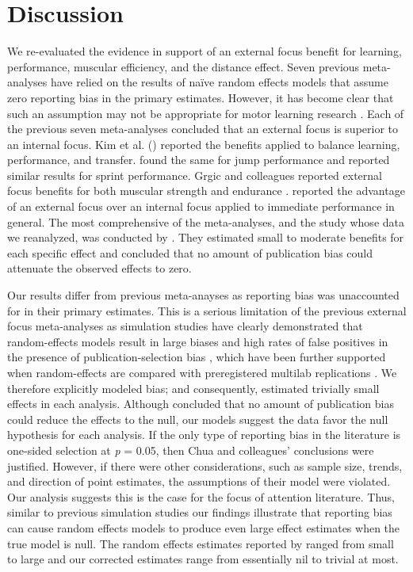 \documentclass[man,floatsintext,letterpaper,12pt]{apa7}
\begin{document}
\clearpage

\section{Discussion}

We re-evaluated the evidence in support of an external focus benefit for learning, performance, muscular efficiency, and the distance effect. Seven previous meta-analyses have relied on the results of naïve random effects models that assume zero reporting bias in the primary estimates. However, it has become clear that such an assumption may not be appropriate for motor learning research \autocite{mckay2022b,mckay2023}. Each of the previous seven meta-analyses concluded that an external focus is superior to an internal focus. Kim et al. (\citeyear{kim2017}) reported the benefits applied to balance learning, performance, and transfer. \textcite{makaruk2020} found the same for jump performance and \textcite{li2022} reported similar results for sprint performance. Grgic and colleagues reported external focus benefits for both muscular strength and endurance \autocite{grgic2021,grgic2022}. \textcite{nicklas2022} reported the advantage of an external focus over an internal focus applied to immediate performance in general. The most comprehensive of the meta-analyses, and the study whose data we reanalyzed, was conducted by \textcite{chua2021}. They estimated small to moderate benefits for each specific effect and concluded that no amount of publication bias could attenuate the observed effects to zero.

Our results differ from previous meta-anayses as reporting bias was unaccounted for in their primary estimates. This is a serious limitation of the previous external focus meta-analyses as simulation studies have clearly demonstrated that random-effects models result in large biases and high rates of false positives in the presence of publication-selection bias \autocite{bartos2023a,bom2019,stanley2017,stanley2022}, which have been further supported when random-effects are compared with preregistered multilab replications \autocite{kvarven2020}. We therefore explicitly modeled bias; and consequently, estimated trivially small effects in each analysis. Although \textcite{chua2021} concluded that no amount of publication bias could reduce the effects to the null, our models suggest the data favor the null hypothesis for each analysis. If the only type of reporting bias in the literature is one-sided selection at \emph{p} = 0.05, then Chua and colleagues' conclusions were justified. However, if there were other considerations, such as sample size, trends, and direction of point estimates, the assumptions of their model were violated. Our analysis suggests this is the case for the focus of attention literature. Thus, similar to previous simulation studies our findings illustrate that reporting bias can cause random effects models to produce even large effect estimates when the true model is null. The random effects estimates reported by \textcite{chua2021} ranged from small to large and our corrected estimates range from essentially nil to trivial at most.
\end{document}
